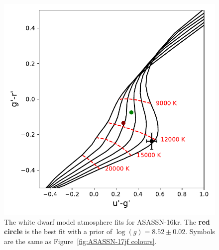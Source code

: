 \begin{figure}
    \centering
    \includegraphics[width=\columnwidth, trim={0 0mm 0 0},clip]{figures/results/three_cvs_with_weird_colours/ASASSN-16kr/PhysicalParams/ASASSN-16kr_colourPlot_alpha_beta.pdf}
    \caption{The white dwarf model atmosphere fits for ASASSN-16kr. The {\bf red circle} is the best fit with a prior of $\log(g)=8.52\pm0.02$. Symbols are the same as Figure~\ref{fig:ASASSN-17jf colours}.}
    \label{fig:ASASSN-16kr colours}
\end{figure}
